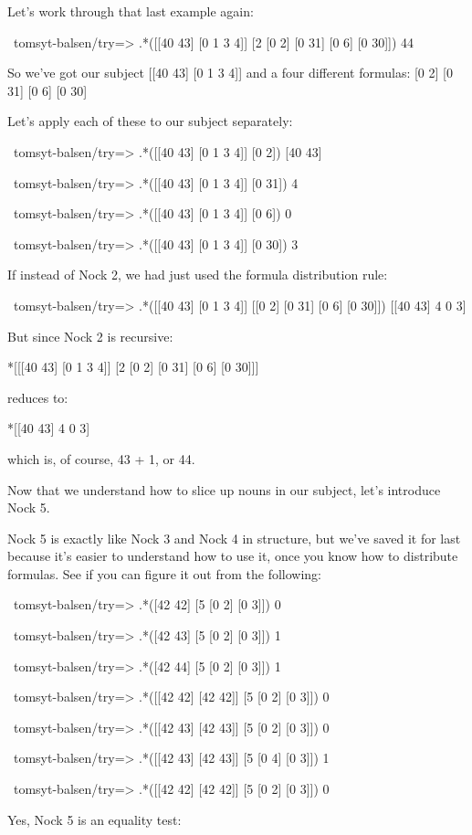 Let's work through that last example again:

\begin{code}
~tomsyt-balsen/try=> .*([[40 43] [0 1 3 4]] [2 [0 2] [0 31] [0 6] [0 30]])
44
\end{code}

So we've got our subject [[40 43] [0 1 3 4]] and a four different formulas: 
[0 2] [0 31] [0 6] [0 30]

Let's apply each of these to our subject separately:

\begin{code}
~tomsyt-balsen/try=> .*([[40 43] [0 1 3 4]] [0 2])
[40 43]

~tomsyt-balsen/try=> .*([[40 43] [0 1 3 4]] [0 31])
4

~tomsyt-balsen/try=> .*([[40 43] [0 1 3 4]] [0 6])
0

~tomsyt-balsen/try=> .*([[40 43] [0 1 3 4]] [0 30])
3
\end{code}

If instead of Nock 2, we had just used the formula distribution rule:

\begin{code}
~tomsyt-balsen/try=> .*([[40 43] [0 1 3 4]] [[0 2] [0 31] [0 6] [0 30]])
[[40 43] 4 0 3]
\end{code}

But since Nock 2 is recursive:

\begin{code}
*[[[40 43] [0 1 3 4]] [2 [0 2] [0 31] [0 6] [0 30]]]
\end{code}
reduces to:

\begin{code}
*[[40 43] 4 0 3]
\end{code}
which is, of course, 43 + 1, or 44.

Now that we understand how to slice up nouns in our subject, let's introduce Nock 5. 

Nock 5 is exactly like Nock 3 and Nock 4 in structure, but we've saved it for
last because it's easier to understand how to use it, once you know how to
distribute formulas. See if you can figure it out from the following:

\begin{code}
~tomsyt-balsen/try=> .*([42 42] [5 [0 2] [0 3]])
0

~tomsyt-balsen/try=> .*([42 43] [5 [0 2] [0 3]])
1

~tomsyt-balsen/try=> .*([42 44] [5 [0 2] [0 3]])
1

~tomsyt-balsen/try=> .*([[42 42] [42 42]] [5 [0 2] [0 3]])
0

~tomsyt-balsen/try=> .*([[42 43] [42 43]] [5 [0 2] [0 3]])
0

~tomsyt-balsen/try=> .*([[42 43] [42 43]] [5 [0 4] [0 3]])
1

~tomsyt-balsen/try=> .*([[42 42] [42 42]] [5 [0 2] [0 3]])
0
\end{code}
Yes, Nock 5 is an equality test:

